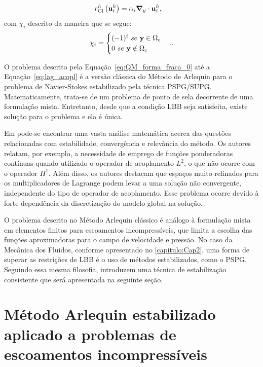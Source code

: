 \begin{align}
	r_{\mathrm{Ci}}^{h}\left(\mathbf{u}_i^{h}\right)&= \alpha_i \boldsymbol{\nabla}_y \cdot \mathbf{u}_i^{h} \label{eq:res_C_i}, 
\end{align}
\noindent com $\chi_{i}$ descrito da maneira que se segue:
\begin{align}
	\chi_{i} = \begin{cases} (-1)^{i} \ se \ \mathbf{y} \in \Omega_c \\
		0 \ se \ \mathbf{y} \notin \Omega_c \end{cases}.						. 
\end{align}

O problema descrito pela Equação~\eqref{eq:QM_forma_fraca_0} até a Equação~\eqref{eq:lag_acopl} é a versão clássica do Método de Arlequin para o problema de Navier-Stokes estabilizado pela técnica PSPG/SUPG. Matematicamente, trata-se de um problema de ponto de sela decorrente de uma formulação mista. Entretanto, desde que a condição LBB seja satisfeita, existe solução para o problema e ela é única. 

Em  pode-se encontrar uma vasta análise matemática acerca das questões relacionadas com estabilidade, convergência e relevância do método. Os autores relatam, por exemplo, a necessidade de emprego de funções ponderadoras contínuas quando utilizado o operador de acoplamento $L^{2}$, o que não ocorre com o operador $H^{1}$. Além disso,  os autores destacam que espaços muito refinados para os multiplicadores de Lagrange podem levar a uma solução não convergente, independente do tipo de operador de acoplamento. Esse problema ocorre devido à forte dependência da discretização do modelo global na solução.

O problema descrito no Método Arlequin clássico é análogo à formulação mista em elementos finitos para escoamentos incompressíveis, que limita a escolha das funções aproximadoras para o campo de velocidade e pressão. No caso da Mecânica dos Fluidos, conforme apresentado no \autoref{capitulo:Cap2}, uma forma de superar as restrições de LBB é o uso de métodos estabilizados, como o PSPG. Seguindo essa mesma filosofia,   introduzem uma técnica de estabilização consistente que será apresentada na seguinte seção. 

\section{Método Arlequin estabilizado aplicado a problemas de escoamentos incompressíveis}

